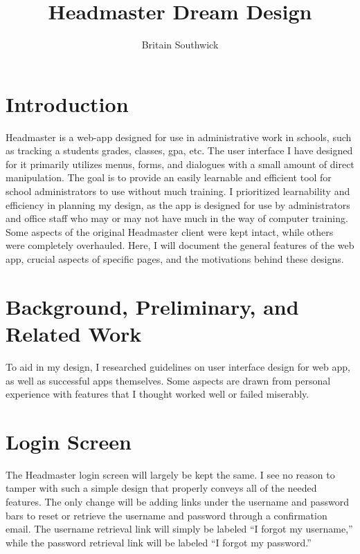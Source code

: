 \documentclass{article}
\title{Headmaster Dream Design}
\author{Britain Southwick}
\date{}
\begin{document}
\maketitle


\pagebreak
\tableofcontents

\pagebreak
\section{Introduction}
\label{Introduction}

Headmaster is a web-app designed for use in administrative work in schools, such as tracking a students grades, classes, gpa, etc. The user interface I have designed for it primarily utilizes menus, forms, and dialogues with a small amount of direct manipulation. The goal is to provide an easily learnable and efficient tool for school administrators to use without much training. I prioritized learnability and efficiency in planning my design, as the app is designed for use by administrators and office staff who may or may not have much in the way of computer training. Some aspects of the original Headmaster client were kept intact, while others were completely overhauled. Here, I will document the general features of the web app, crucial aspects of specific pages, and the motivations behind these designs.

\section{Background, Preliminary, and Related Work}

To aid in my design, I researched guidelines on user interface design for web app, as well as successful apps themselves. Some aspects are drawn from personal experience with features that I thought worked well or failed miserably. 

\section{Login Screen}

The Headmaster login screen will largely be kept the same. I see no reason to tamper with such a simple design that properly conveys all of the needed features. The only change will be adding links under the username and password bars to reset or retrieve the username and password through a confirmation email. The username retrieval link will simply be labeled ``I forgot my username,'' while the password retrieval link will be labeled ``I forgot my password.''
\end{document}
